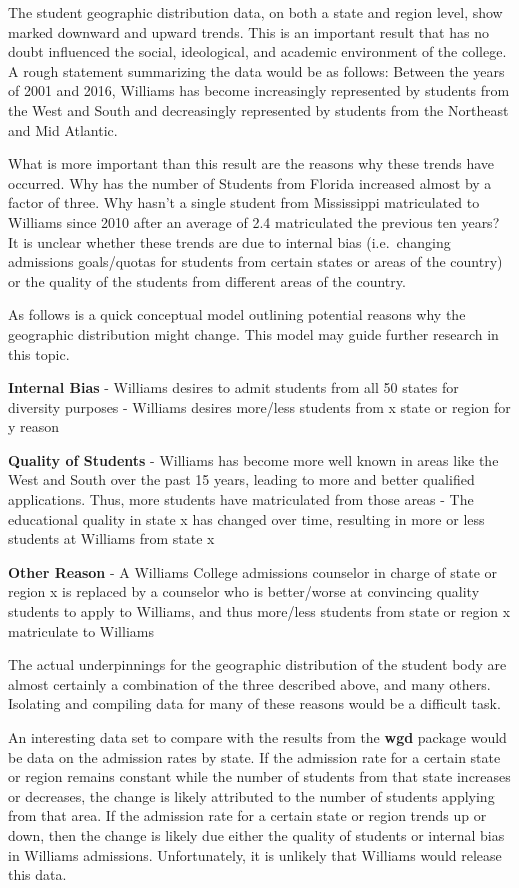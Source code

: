 The student geographic distribution data, on both a state and region
level, show marked downward and upward trends. This is an important
result that has no doubt influenced the social, ideological, and
academic environment of the college. A rough statement summarizing the
data would be as follows: Between the years of 2001 and 2016, Williams
has become increasingly represented by students from the West and South
and decreasingly represented by students from the Northeast and Mid
Atlantic.

What is more important than this result are the reasons why these trends
have occurred. Why has the number of Students from Florida increased
almost by a factor of three. Why hasn't a single student from
Mississippi matriculated to Williams since 2010 after an average of 2.4
matriculated the previous ten years? It is unclear whether these trends
are due to internal bias (i.e.~changing admissions goals/quotas for
students from certain states or areas of the country) or the quality of
the students from different areas of the country.

As follows is a quick conceptual model outlining potential reasons why
the geographic distribution might change. This model may guide further
research in this topic.

\textbf{Internal Bias} - Williams desires to admit students from all 50
states for diversity purposes - Williams desires more/less students from
x state or region for y reason

\textbf{Quality of Students} - Williams has become more well known in
areas like the West and South over the past 15 years, leading to more
and better qualified applications. Thus, more students have matriculated
from those areas - The educational quality in state x has changed over
time, resulting in more or less students at Williams from state x

\textbf{Other Reason} - A Williams College admissions counselor in
charge of state or region x is replaced by a counselor who is
better/worse at convincing quality students to apply to Williams, and
thus more/less students from state or region x matriculate to Williams

The actual underpinnings for the geographic distribution of the student
body are almost certainly a combination of the three described above,
and many others. Isolating and compiling data for many of these reasons
would be a difficult task.

An interesting data set to compare with the results from the
\textbf{wgd} package would be data on the admission rates by state. If
the admission rate for a certain state or region remains constant while
the number of students from that state increases or decreases, the
change is likely attributed to the number of students applying from that
area. If the admission rate for a certain state or region trends up or
down, then the change is likely due either the quality of students or
internal bias in Williams admissions. Unfortunately, it is unlikely that
Williams would release this data.

